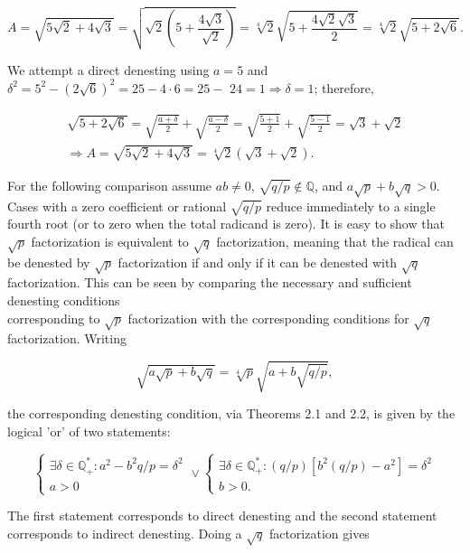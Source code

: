 \documentclass[11pt,letterpaper]{article}
\begin{document}
\[
A=\sqrt{5 \sqrt{2}+4 \sqrt{3}}=\sqrt{\sqrt{2}\left(5+\frac{4 \sqrt{3}}{\sqrt{2}}\right)}=\sqrt[4]{2} \sqrt{5+\frac{4 \sqrt{2} \sqrt{3}}{2}}=\sqrt[4]{2} \sqrt{5+2 \sqrt{6}} .
\]

We attempt a direct denesting using $a=5$ and $\delta^{2}=5^{2}-(2 \sqrt{6})^{2}=25-4 \cdot 6=25-$ $24=1 \Longrightarrow \delta=1$; therefore,

\[
\begin{gathered}
\sqrt{5+2 \sqrt{6}}=\sqrt{\frac{a+\delta}{2}}+\sqrt{\frac{a-\delta}{2}}=\sqrt{\frac{5+1}{2}}+\sqrt{\frac{5-1}{2}}=\sqrt{3}+\sqrt{2} \\
\Longrightarrow A=\sqrt{5 \sqrt{2}+4 \sqrt{3}}=\sqrt[4]{2}(\sqrt{3}+\sqrt{2}) .
\end{gathered}
\]

For the following comparison assume $ab\ne0$, $\sqrt{q/p}\notin\mathbb Q$, and $a\sqrt p+b\sqrt q>0$. Cases with a zero coefficient or rational $\sqrt{q/p}$ reduce immediately to a single fourth root (or to zero when the total radicand is zero). It is easy to show that $\sqrt{p}$ factorization is equivalent to $\sqrt{q}$ factorization, meaning that the radical can be denested by $\sqrt{p}$ factorization if and only if it can be denested with $\sqrt{q}$ factorization. This can be seen by comparing the necessary and sufficient denesting conditions\\
corresponding to $\sqrt{p}$ factorization with the corresponding conditions for $\sqrt{q}$ factorization. Writing


\begin{equation*}
\sqrt{a \sqrt{p}+b \sqrt{q}}=\sqrt[4]{p} \sqrt{a+b \sqrt{q / p}}, \tag{8}\label{eq:8}
\end{equation*}


the corresponding denesting condition, via Theorems 2.1 and 2.2, is given by the logical 'or' of two statements:

\[
\left\{\begin{array} { l } 
{ \exists \delta \in \mathbb { Q } _ { + } ^ { * } : a ^ { 2 } - b ^ { 2 } q / p = \delta ^ { 2 } }  \tag{9}\label{eq:9}\\
{ a > 0 }
\end{array} \vee \left\{\begin{array}{l}
\exists \delta \in \mathbb{Q}_{+}^{*}:(q / p)\left[b^{2}(q / p)-a^{2}\right]=\delta^{2} \\
b>0 .
\end{array}\right.\right.
\]

The first statement corresponds to direct denesting and the second statement corresponds to indirect denesting. Doing a $\sqrt{q}$ factorization gives
\end{document}
